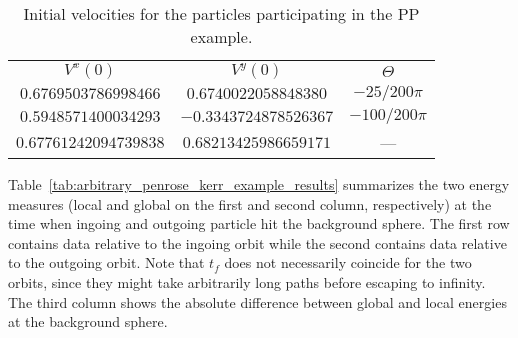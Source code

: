 \begin{table}[]
  \centering
  \begin{tabular}{ccc}
    \hline\hline
    $V^x(0)$              & $V^y(0)$              & $\Theta$       \\
    $0.6769503786998466$  & $0.6740022058848380$  & $-25/200 \pi$  \\
    $0.5948571400034293$  & $-0.3343724878526367$ & $-100/200 \pi$ \\
    $0.67761242094739838$ & $0.68213425986659171$ & ---            \\ \hline\hline
  \end{tabular}
  \caption{Initial velocities for the particles participating in the PP example.}
  \label{tab:arbitrary_penrose_kerr_example_velocities}
\end{table}

Table~\ref{tab:arbitrary_penrose_kerr_example_results} summarizes the two energy measures (local and global on the first and second column, respectively) at the time when ingoing and outgoing particle hit the background sphere. The first row contains data relative to the ingoing orbit while the second contains data relative to the outgoing orbit. Note that $t_f$ does not necessarily coincide for the two orbits, since they might take arbitrarily long paths before escaping to infinity. The third column shows the absolute difference between global and local energies at the background sphere.

\begin{table}[]
  \centering
  \caption{Energy measures at the time of collision with the background sphere. Note that $t_f$ is not necessarily the same for both trajectories.}
  \label{tab:arbitrary_penrose_kerr_example_results}
\end{table}

